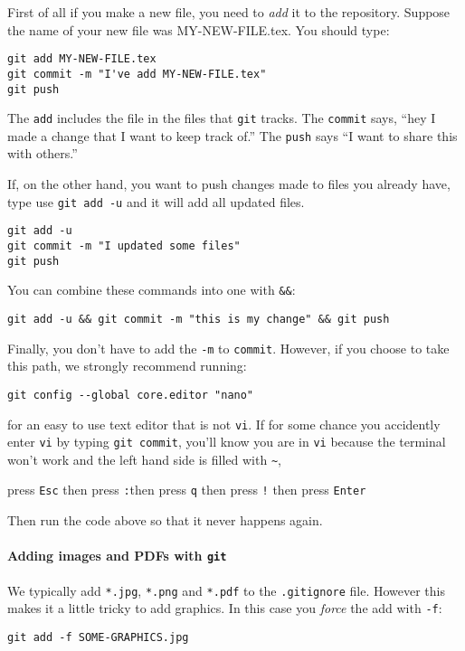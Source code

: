 \documentclass{ximera}
\begin{document}
First of all if you make a new file, you need to \textit{add} it to the
repository. Suppose the name of your new file was MY-NEW-FILE.tex. You should
type:

\begin{verbatim}
git add MY-NEW-FILE.tex
git commit -m "I've add MY-NEW-FILE.tex"
git push
\end{verbatim}
The \verb!add! includes the file in the files that \verb!git! tracks. The
\verb!commit! says, ``hey I made a change that I want to keep track of.'' The
\verb!push! says ``I want to share this with others.''

If, on the other hand, you want to push changes made to files you already have,
type use \verb!git add -u! and it will add all updated files. 
\begin{verbatim}
git add -u
git commit -m "I updated some files"
git push
\end{verbatim}
You can combine these commands into one with \verb!&&!:
\begin{verbatim}
git add -u && git commit -m "this is my change" && git push
\end{verbatim}

Finally, you don't have to add the \verb!-m! to \verb!commit!. However, if you
choose to take this path, we strongly recommend running:
\begin{verbatim}
git config --global core.editor "nano"
\end{verbatim}
for an easy to use text editor that is not \verb!vi!. If for some chance you
accidently enter \verb!vi! by typing \verb!git commit!, you'll know you are in
\verb!vi! because the terminal won't work and the left hand side is filled with
\verb!~!,
\begin{center}
    press \verb!Esc! \quad then press \verb!:!\quad then press \verb!q! \quad
    then
    press \verb#!# \quad then press \verb!Enter!
\end{center}
Then run the code above so that it never happens again.

\paragraph{Adding images and PDFs with \texttt{git}}

We typically add \verb!*.jpg!, \verb!*.png! and \verb!*.pdf! to the
\verb!.gitignore! file. However this makes it a little tricky to add graphics.
In this case you \textit{force} the add with \verb!-f!:
\begin{verbatim}
git add -f SOME-GRAPHICS.jpg
\end{verbatim}
\end{document}
